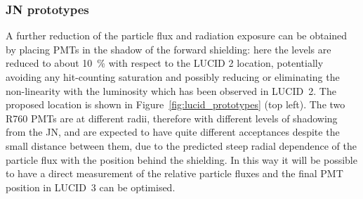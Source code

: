 \documentclass[cernpreprint, atlasdraft=false, UKenglish,british,orcidlogo, texmf, orcidlogo]{atlasdoc}
\begin{document}
\subsubsection{JN prototypes}
A further reduction of the particle flux and radiation exposure can be obtained
by placing \glspl{PMT} in the shadow of the forward shielding: here the levels are
reduced to about \SI{10}{\percent} with respect to the \gls{LUCID} 2 location, potentially
avoiding any hit-counting saturation and possibly
reducing or eliminating the non-linearity with the luminosity which has been
observed in \gls{LUCID}~2. The proposed location is shown in Figure~\ref{fig:lucid_prototypes} (top left).
The two R760 \glspl{PMT} are at different radii, therefore with different levels of
shadowing from the JN, and are expected to have quite different acceptances
despite the small distance between them, due to the predicted steep radial dependence of the
particle flux with the position behind the shielding. In this way it will be
possible to have a direct measurement of the relative particle fluxes and
the final \gls{PMT} position in \gls{LUCID}~3 can be optimised.
\end{document}
